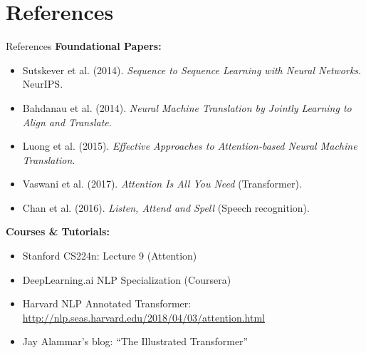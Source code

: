\section{References}
\begin{frame}[allowframebreaks]{References}
    \textbf{Foundational Papers:}
    \begin{itemize}
        \setlength{\itemsep}{1em}
        \item Sutskever et al. (2014). \emph{Sequence to Sequence Learning with Neural Networks}. NeurIPS.
        \item Bahdanau et al. (2014). \emph{Neural Machine Translation by Jointly Learning to Align and Translate}.
        \item Luong et al. (2015). \emph{Effective Approaches to Attention-based Neural Machine Translation}.
        \item Vaswani et al. (2017). \emph{Attention Is All You Need} (Transformer).
        \item Chan et al. (2016). \emph{Listen, Attend and Spell} (Speech recognition).
    \end{itemize}
\framebreak
    \textbf{Courses \& Tutorials:}
    \begin{itemize}
        \setlength{\itemsep}{1em}
        \item Stanford CS224n: Lecture 9 (Attention)
        \item DeepLearning.ai NLP Specialization (Coursera)
        \item Harvard NLP Annotated Transformer: \url{http://nlp.seas.harvard.edu/2018/04/03/attention.html}
        \item Jay Alammar’s blog: ``The Illustrated Transformer''
    \end{itemize}
\end{frame}